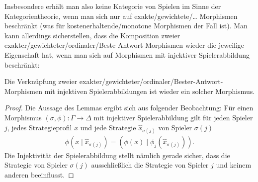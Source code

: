 Insbesondere erhält man also keine Kategorie von Spielen im Sinne der Kategorientheorie, wenn man sich nur auf exakte/gewichtete/\dots{} Morphismen beschränkt (was für kostenerhaltende/monotone Morphismen der Fall ist). Man kann allerdings sicherstellen, dass die Komposition zweier exakter/gewichteter/ordinaler/Beste-Antwort-Morphismen wieder die jeweilige Eigenschaft hat, wenn man sich auf Morphismen mit injektiver Spielerabbildung beschränkt:

\begin{lemma}\label{lemma:KompositionVonMorphismen}
	Die Verknüpfung zweier exakter/gewichteter/ordinaler/Bester-Antwort-Morphismen mit injektiven Spielerabbildungen ist wieder ein solcher Morphismus.
\end{lemma}

\begin{proof}
	Die Aussage des Lemmas ergibt sich aus folgender Beobachtung: Für einen Morphismus $(\sigma, \phi): \Gamma \to \Delta$ mit injektiver Spielerabbildung gilt für jeden Spieler $j$, jedes Strategieprofil $x$ und jede Strategie $\hat{x}_{\sigma(j)}$ von Spieler $\sigma(j)$
		\begin{align}\label{eq:StrategiewechselFuerInjektiveSpielerabbildung}
			\phi(x \mid \hat{x}_{\sigma(j)}) = (\phi(x) \mid \phi_{j}(\hat{x}_{\sigma(j)})).
		\end{align}
	Die Injektivität der Spielerabbildung stellt nämlich gerade sicher, dass die Strategie von Spieler $\sigma(j)$ ausschließlich die Strategie von Spieler $j$ und keinem anderen beeinflusst.
	

\end{proof}

